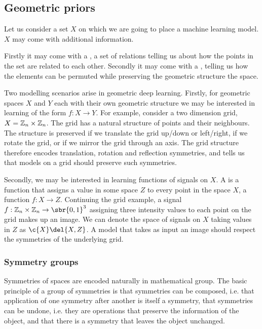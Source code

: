 \subsection{Geometric priors}

Let us consider a set \(X\) on which we are going to place a machine learning model.
\(X\) may come with additional information.

Firstly it may come with a , a set of relations telling us about how the points in the set are related to each other.
Secondly it may come with a , telling us how the elements can be permuted while preserving the geometric structure the space.

Two modelling scenarios arise in geometric deep learning.
Firstly, for geometric spaces \(X\) and \(Y\) each with their own geometric structure we may be interested in learning  of the form \(f: X \to Y\).
For example, consider a two dimension grid, \(X= \mathbb{Z}_n  \times \mathbb{Z}_n\).
The grid has a natural structure of points and their neighbours.
The structure is preserved if we translate the grid up/down or left/right, if we rotate the grid, or if we mirror the grid through an axis.
The grid structure therefore encodes translation, rotation and reflection symmetries, and tells us that models on a grid should preserve such symmetries.

Secondly, we may be interested in learning functions of signals on \(X\).
A  is a function that assigns a value in some space \(Z\) to every point in the space \(X\), a function \(f: X \to Z\).
Continuing the grid example, a signal \(f: \Z_n  \x \Z_n \to \sbr{0,1}^3\) assigning three intensity values to each point on the grid makes up an image.
We can denote the space of signals on \(X\) taking values in \(Z\) as \(\c{X}\del{X, Z}\).
A model that takes as input an image should respect the symmetries of the underlying grid.

\subsubsection{Symmetry groups}

Symmetries of spaces are encoded naturally in mathematical group.
The basic principle of a group of symmetries is that symmetries can be composed, i.e. that application of one symmetry after another is itself a symmetry, that symmetries can be undone, i.e. they are operations that preserve the information of the object, and that there is a symmetry that leaves the object unchanged.

